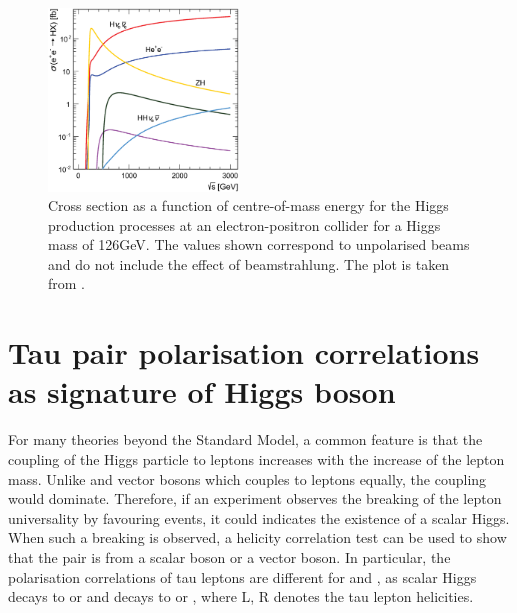 \begin{figure}[!htbp]
\centering
\includegraphics[width=0.45\textwidth]{theory/HiggsCLICcrossSection}
\caption[]
{Cross section as a function of centre-of-mass energy for the Higgs production processes at an electron-positron collider for a Higgs mass of 126GeV. The values shown correspond
to unpolarised beams and do not include the effect of beamstrahlung. The plot is taken from \cite{Abramowicz:2016zbo}.}
\label{fig:theoryHiggsCrossSection}
\end{figure}


\section{Tau pair polarisation correlations as signature of Higgs boson}
\label{sec:theoryTauPair}
For many theories beyond the Standard Model, a common feature is that the coupling of the Higgs particle to leptons increases with the increase of the lepton mass. Unlike \PZ and \Pgamma vector bosons which couples to leptons equally, the \HigssTauTau coupling would dominate. Therefore, if an experiment observes the breaking of the lepton universality by favouring \TauTau events, it could indicates the existence of a scalar Higgs. When such a breaking is observed, a helicity correlation test can be used to show that the \TauTau pair is from a scalar boson or a vector boson. In particular, the polarisation correlations of tau leptons are different for \HiggsToTauTau and \ZToTauTau, as scalar Higgs decays to  or  and \PZ decays to  or , where L, R denotes the tau lepton helicities.


